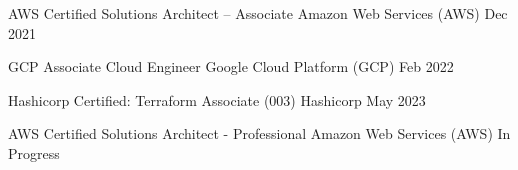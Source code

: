 

\begin{cvhonors}

  \cvhonor
    {AWS Certified Solutions Architect – Associate} %
    {Amazon Web Services (AWS)} %
    {} %
    {Dec 2021} %

  \cvhonor
    {GCP Associate Cloud Engineer} %
    {Google Cloud Platform (GCP)} %
    {} %
    {Feb 2022} %

  \cvhonor
    {Hashicorp Certified: Terraform Associate (003)} %
    {Hashicorp} %
    {} %
    {May 2023} %

  \cvhonor
    {AWS Certified Solutions Architect - Professional} %
    {Amazon Web Services (AWS)} %
    {In Progress} %
    {} %

\end{cvhonors}
